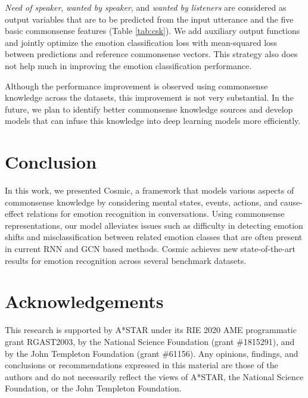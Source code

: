 \documentclass[11pt,a4paper]{article}
\begin{document}
 \textit{Need of speaker}, \textit{wanted by speaker}, and \textit{wanted by listeners} are considered as output variables that are to be predicted from the input utterance and the five basic commonsense features (Table \ref{tab:csk}). We add auxiliary output functions and jointly optimize the emotion classification loss with mean-squared loss between predictions and reference commonsense vectors. This strategy also does not help much in improving the emotion classification performance.

Although the performance improvement is observed using commonsense knowledge across the datasets, this improvement is not very substantial. In the future, we plan to identify better commonsense knowledge sources and develop models that can infuse this knowledge into deep learning models more efficiently.






\section{Conclusion}
In this work, we presented {\sc Cosmic}, a framework that models various aspects of commonsense knowledge by considering mental states, events, actions, and cause-effect relations for emotion recognition in conversations. Using commonsense representations, our model alleviates issues such as difficulty in detecting emotion shifts and misclassification between related emotion classes that are often present in current RNN and GCN based methods. {\sc Cosmic} achieves new state-of-the-art results for emotion recognition across several benchmark datasets.

 \section*{Acknowledgements}
 This research is supported by A*STAR under its RIE 2020 AME programmatic grant RGAST2003, by the National Science Foundation (grant \#1815291), and by the John Templeton Foundation (grant \#61156). Any opinions, findings, and conclusions or recommendations expressed in this material are those of the authors and do not necessarily reflect the views of A*STAR, the National Science Foundation, or the John Templeton Foundation.




\end{document}
